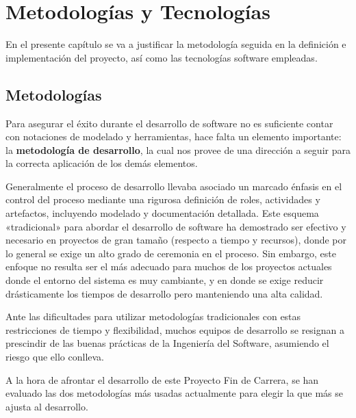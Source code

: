 %
%
\chapter[Metodologías y Tecnologías]{
	Metodologías y Tecnologías
	\label{cap:metodologia}
}

En el presente capítulo se va a justificar la metodología seguida en la definición e implementación del proyecto, así como las tecnologías software empleadas.

\section{Metodologías} %
  \label{sec:metodologias}

  Para asegurar el éxito durante el desarrollo de software no es suficiente contar con notaciones de modelado y herramientas, hace falta un elemento importante: la {\bf metodología de desarrollo}, la cual nos provee de una dirección a seguir para la correcta aplicación de los demás elementos.

  	Generalmente el proceso de desarrollo llevaba asociado un marcado énfasis en el control del proceso mediante una rigurosa definición de roles, actividades y artefactos, incluyendo modelado y documentación detallada. Este esquema «tradicional» para abordar el desarrollo de software ha demostrado ser efectivo y necesario en proyectos de gran tamaño (respecto a tiempo y recursos), donde por lo general se exige un alto grado de ceremonia en el proceso. Sin embargo, este enfoque no resulta ser el más adecuado para muchos de los proyectos actuales donde el entorno del sistema es muy cambiante, y en donde se exige reducir drásticamente los tiempos de desarrollo pero manteniendo una alta calidad.

  	Ante las dificultades para utilizar metodologías tradicionales con estas restricciones de tiempo y flexibilidad, muchos equipos de desarrollo se resignan a prescindir de las buenas prácticas de la Ingeniería del Software, asumiendo el riesgo que ello	conlleva. 

  A la hora de afrontar el desarrollo de este Proyecto Fin de Carrera, se han evaluado las dos metodologías más usadas actualmente para elegir la que más se ajusta al desarrollo.
  
